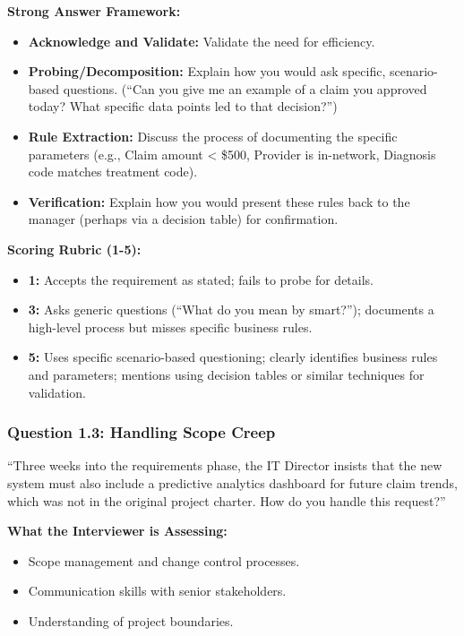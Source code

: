 \documentclass[
  11pt,
  openany,
  oneside]{book}
\providecommand{\tightlist}{%
  \setlength{\itemsep}{0pt}\setlength{\parskip}{0pt}}
\begin{document}
\textbf{Strong Answer Framework:}

\begin{itemize}
\tightlist
\item
  \textbf{Acknowledge and Validate:} Validate the need for efficiency.
\item
  \textbf{Probing/Decomposition:} Explain how you would ask specific,
  scenario-based questions. (``Can you give me an example of a claim you
  approved today? What specific data points led to that decision?'')
\item
  \textbf{Rule Extraction:} Discuss the process of documenting the
  specific parameters (e.g., Claim amount \textless{} \$500, Provider is
  in-network, Diagnosis code matches treatment code).
\item
  \textbf{Verification:} Explain how you would present these rules back
  to the manager (perhaps via a decision table) for confirmation.
\end{itemize}

\textbf{Scoring Rubric (1-5):}

\begin{itemize}
\tightlist
\item
  \textbf{1:} Accepts the requirement as stated; fails to probe for
  details.
\item
  \textbf{3:} Asks generic questions (``What do you mean by smart?'');
  documents a high-level process but misses specific business rules.
\item
  \textbf{5:} Uses specific scenario-based questioning; clearly
  identifies business rules and parameters; mentions using decision
  tables or similar techniques for validation.
\end{itemize}

\subsubsection{Question 1.3: Handling Scope
Creep}\label{question-1.3-handling-scope-creep}

``Three weeks into the requirements phase, the IT Director insists that
the new system must also include a predictive analytics dashboard for
future claim trends, which was not in the original project charter. How
do you handle this request?''

\textbf{What the Interviewer is Assessing:}

\begin{itemize}
\tightlist
\item
  Scope management and change control processes.
\item
  Communication skills with senior stakeholders.
\item
  Understanding of project boundaries.
\end{itemize}
\end{document}
